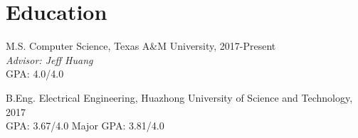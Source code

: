 \documentclass[12pt,letterpaper]{report}
\begin{document}
	
	\section*{Education}
	
	\begin{tablist}
		
		
		\item[M.S.]  \tab Computer Science, Texas A\&M University, 2017-Present \\
		\textit{Advisor: Jeff Huang}\\
		GPA: 4.0/4.0
		
		\item[B.Eng.]  \tab Electrical Engineering, Huazhong University of Science and Technology, 2017 \\
		GPA: 3.67/4.0 \hspace{0.5cm} Major GPA: 3.81/4.0
				
	\end{tablist}
	
	
	
%	
%		
%		
%		
%		
%		
\end{document}

